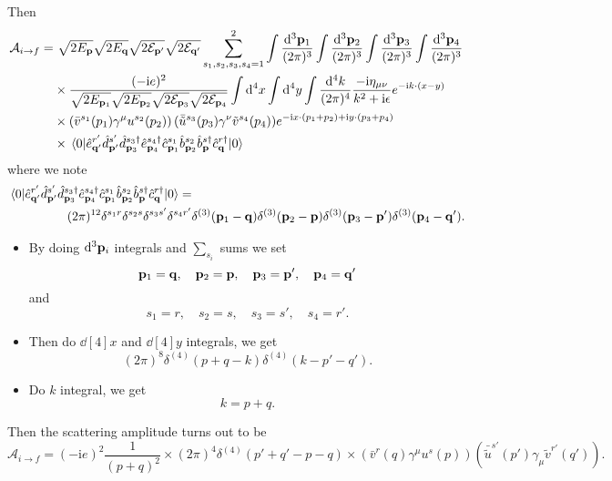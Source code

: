 \documentclass[a4paper,11pt]{article}
\begin{document}
	Then 
	\begin{align*}
		\mathcal{A}_{i \to f} = &\ \sqrt{2 E _{\vb p}} \sqrt{2 E _{\vb q}} \sqrt{2 \mathcal{E}_{\vb p'}} \sqrt{2 \mathcal{E}_{\vb q'}} \sum _{s_1,s_2,s_3,s_4 = 1}^2 \int \frac{\dd[3]{\vb p_1}}{(2\pi)^{3}} \int \frac{\dd[3]{\vb p_2}}{(2\pi)^{3}} \int \frac{\dd[3]{\vb p_3}}{(2\pi)^{3}} \int \frac{\dd[3]{\vb p_4}}{(2\pi)^{3}}\\
		& \times \frac{(-\mathrm{i} e)^2}{\sqrt{2 E _{\vb p_1}} \sqrt{2 E _{\vb p_2}} \sqrt{2 \mathcal{E}_{\vb p_3}} \sqrt{2 \mathcal{E}_{\vb p_4}}} \int \dd[4]{x}\int \dd[4]{y} \int \frac{\dd[4]{k}}{(2\pi)^{4}} \frac{-\mathrm{i} \eta _{\mu \nu}}{k^2 + \mathrm{i} \epsilon} e ^{- \mathrm{i} k \cdot (x - y)}\\
		& \times \left( \bar v ^{s_1}(p_1) \gamma^\mu u ^{s_2}(p_2) \right) (\bar{\tilde u} ^{s_3}(p_3) \gamma^\nu \tilde v ^{s_4}(p_4)) e ^{- \mathrm{i} x \cdot (p_1 + p_2) + \mathrm{i} y \cdot (p_3 + p_4)}\\
		& \times \mel{0}{\hat e ^{r'}_{\vb q'} \hat d ^{s'}_{\vb p'} \hat d^{s_3\dagger}_{\vb p_3}\hat e ^{s_4\dagger}_{\vb p_4} \hat c ^{s_1}_{\vb p_1}\hat b ^{s_2}_{\vb p_2} \hat b ^{s\dagger}_{\vb p} \hat c ^{r\dagger}_{\vb q}}{0}
	\end{align*}
	where we note
	\begin{align*}
		\mel{0}{\hat e ^{r'}_{\vb q'} \hat d ^{s'}_{\vb p'} \hat d^{s_3\dagger}_{\vb p_3}\hat e ^{s_4\dagger}_{\vb p_4} \hat c ^{s_1}_{\vb p_1}\hat b ^{s_2}_{\vb p_2} \hat b ^{s\dagger}_{\vb p} \hat c ^{r\dagger}_{\vb q}}{0} = &\\
		(2 \pi)^{12} \delta ^{s_1 r} \delta ^{s_2 s} \delta ^{s_3 s'} \delta ^{s_4 r'} &\delta ^{(3)}(\vb p_1 - \vb q) \delta ^{(3)}(\vb p_2 - \vb p) \delta ^{(3)}(\vb p_3 - \vb p') \delta ^{(3)} (\vb p_4 - \vb q').
	\end{align*}
	\begin{itemize}
		\item By doing $\dd[3]{\vb p_i}$ integrals and $\sum _{s_i}$ sums we set  \[
			\vb p_1 = \vb q, \quad \vb p_2 = \vb p, \quad \vb p_3 = \vb p', \quad \vb p_4 = \vb q' 
		\]
		and \[
			s_1 = r, \quad s_2 = s, \quad s_3 = s', \quad s_4 = r'.
		\]
		\item Then do $\dd[4]{x}$ and $\dd[4]{y}$ integrals, we get \[
			(2 \pi)^8 \delta ^{(4)}(p + q - k) \delta ^{(4)} (k - p' - q').
		\]
		\item Do $k$ integral, we get \[
			k = p + q.
		\]
	\end{itemize}

	Then the scattering amplitude turns out to be 
	\[
		\mathcal{A}_{i \to f} = (-\mathrm{i} e)^2 \frac{1}{(p+q)^2} \times (2 \pi)^4 \delta ^{(4)} (p' + q' - p - q) \times ( \bar v^r(q) \gamma^\mu u^s(p) )( \bar{\tilde u}^{s'}(p')\gamma_\mu \tilde v ^{r'}(q') ).
	\]
	
\end{document}
